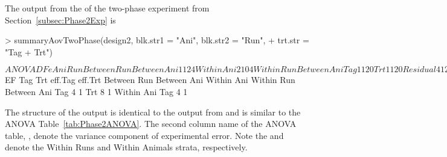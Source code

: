 \documentclass[article]{jss}
\begin{document}
The output from the  of the two-phase experiment from Section~\ref{subsec:Phase2Exp} is
\begin{CodeChunk}
\begin{CodeInput}
> summaryAovTwoPhase(design2, blk.str1 = "Ani", blk.str2 = "Run", 
+ trt.str = "Tag + Trt")                                      
\end{CodeInput}
\begin{CodeOutput}
$ANOVA
               DF e Ani Run
Between Run                
   Between Ani 1  1 2   4  
   Within Ani  2  1 0   4  
Within Run                 
   Between Ani             
      Tag      1  1 2   0  
      Trt      1  1 2   0  
      Residual 4  1 2   0  
   Within Ani              
      Tag      2  1 0   0  
      Residual 4  1 0   0  
$EF
               Tag Trt eff.Tag eff.Trt
Between Run                           
   Between Ani                        
   Within Ani                         
Within Run                            
   Between Ani                        
      Tag      4       1              
      Trt          8           1      
   Within Ani                         
      Tag      4       1              
\end{CodeOutput}
\end{CodeChunk}
The structure of the output is identical to the output from  and is similar to the ANOVA Table~\ref{tab:Phase2ANOVA}. The second column name of the ANOVA table, , denote the variance component of experimental error. Note the  and  denote the Within Runs and Within Animals strata, respectively. 
\end{document}
